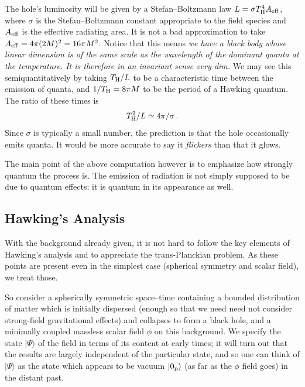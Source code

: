 \documentclass[12pt]{article}
\begin{document}
The hole's luminosity will be given by a Stefan--Boltzmann law $L=\sigma T^4_{\rm H}A_{\rm eff}$, where $\sigma$ is the Stefan--Boltzmann constant appropriate to the field species and $A_{\rm eff}$ is the effective radiating area.  It is not a bad approximation to take $A_{\rm eff}=4\pi (2M)^2=16\pi M^2$.  Notice that this means {\em we have a black body whose linear dimension is of the same scale as the wavelength of the dominant quanta at the temperature.  It is therefore in an invariant sense very dim.}  We may see this semiquantitatively by taking 
$T_{\rm H}/L$ to be a characteristic time between the emission of quanta, and $1/T_{\rm H}=8\pi M$ to be the period of a Hawking quantum.  The ratio of these times is
\begin{equation} 
  T_{\rm H}^2/L\simeq 4\pi/\sigma \, .
\end{equation}
Since $\sigma$ is typically a small number, the prediction is that the hole occasionally emits quanta.  It would be more accurate to say it {\em flickers} than that it glows.

The main point of the above computation however is to emphasize how strongly quantum the process is.  The emission of radiation is not simply supposed to be due to quantum effects:  it is quantum in its appearance as well.


\subsection{Hawking's Analysis}

With the background already given, it is not hard to follow the key elements of Hawking's analysis and to appreciate the trans-Planckian problem.  As these points are present even in the simplest case (spherical symmetry and scalar field), we treat those.

So consider a spherically symmetric space--time containing a bounded distribution of matter which is initially dispersed (enough so that we need need not consider strong-field gravitational effects)
and collapses to form a black hole, and a minimally coupled massless scalar field $\phi$ on this background.  We specify the state $|\Psi\rangle$ of the field in terms of its content at early times; it will turn out that the results are largely independent of the particular state, and so one can think of $|\Psi\rangle$ as the state which appears to be vacuum $|0_{\rm p}\rangle$ (as far as the $\phi$ field goes) in the distant past.
\end{document}

